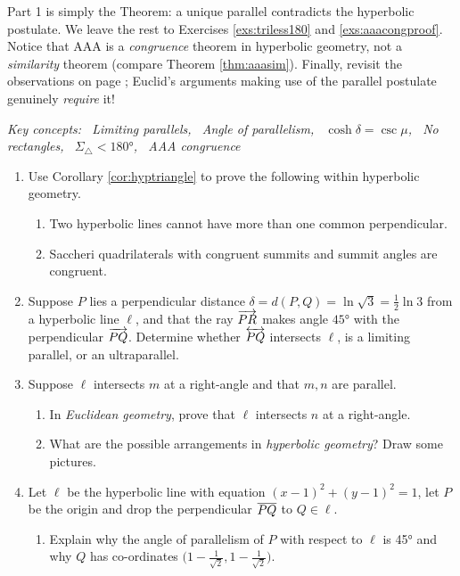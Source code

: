 Part 1 is simply the Theorem: a unique parallel contradicts the hyperbolic postulate. We leave the rest to Exercises \ref{exs:triless180} and \ref{exs:aaacongproof}. Notice that AAA is a \emph{congruence} theorem in hyperbolic geometry, not a \emph{similarity} theorem (compare Theorem \ref{thm:aaasim}). Finally, revisit the observations on page \pageref{pg:absolute}; Euclid's arguments making use of the parallel postulate genuinely \emph{require} it! 


\begin{exercises}
	\hangindent\leftmargini\emph{Key concepts: \ Limiting parallels, \ Angle of parallelism, \ $\cosh\delta=\csc\mu$, \ No rectangles, \ $\Sigma_{\triangle}<\ang{180}$, \ AAA congruence}

	\begin{enumerate}
	  \item Use Corollary \ref{cor:hyptriangle} to prove the following within hyperbolic geometry.
	  \begin{enumerate}
	    \item Two hyperbolic lines cannot have more than one common perpendicular.
	    \item\label{exs:saccherisummitcong} Saccheri quadrilaterals with congruent summits and summit angles are congruent.
	  \end{enumerate}
	  
	  
	  \item Suppose $P$ lies a perpendicular distance $\delta=d(P,Q)=\ln\sqrt 3=\frac 12\ln 3$ from a hyperbolic line $\ell$, and that the ray $\overrightarrow{PR}$ makes angle $\ang{45}$ with the perpendicular $\overrightarrow{PQ}$. Determine whether $\overleftrightarrow{PQ}$ intersects $\ell$, is a limiting parallel, or an ultraparallel. 
	   
	  
	  \item Suppose $\ell$ intersects $m$ at a right-angle and that $m,n$ are parallel. 
	  \begin{enumerate}
	    \item In \emph{Euclidean geometry}, prove that $\ell$ intersects $n$ at a right-angle.
			\item What are the possible arrangements in \emph{hyperbolic geometry}? Draw some pictures.
		\end{enumerate}
	  

	  \item\label{exs:coshcsc1} Let $\ell$ be the hyperbolic line with equation $(x-1)^2+(y-1)^2=1$, let $P$ be the origin and drop the perpendicular $\overline{PQ}$ to $Q\in\ell$.  
	  \begin{enumerate}
	    \item Explain why the angle of parallelism of $P$ with respect to $\ell$ is \ang{45} and why $Q$ has co-ordinates $\big(1-\frac 1{\sqrt 2},1-\frac 1{\sqrt 2}\big)$.
	    

\end{enumerate}
\end{enumerate}
\end{exercises}
